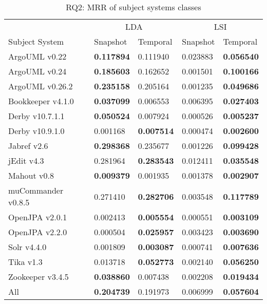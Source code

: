 \begin{table}[ht]
\renewcommand{\arraystretch}{1.3}
\centering
\caption{RQ2: MRR of subject systems classes}
\begin{tabular}{l|ll|ll}
    \toprule
                        & \multicolumn{2}{c|}{LDA}      &  \multicolumn{2}{c}{LSI}  \\
    Subject System      & Snapshot      & Temporal      & Snapshot      & Temporal  \\
    \midrule
ArgoUML v0.22 & {\bf 0.117894 } & 0.111940 & 0.023883 & {\bf 0.056540 } \\
ArgoUML v0.24 & {\bf 0.185603 } & 0.162652 & 0.001501 & {\bf 0.100166 } \\
ArgoUML v0.26.2 & {\bf 0.235158 } & 0.205164 & 0.001235 & {\bf 0.049686 } \\
Bookkeeper v4.1.0 & {\bf 0.037099 } & 0.006553 & 0.006395 & {\bf 0.027403 } \\
Derby v10.7.1.1 & {\bf 0.050524 } & 0.007924 & 0.000526 & {\bf 0.005237 } \\
Derby v10.9.1.0 & 0.001168 & {\bf 0.007514 } & 0.000474 & {\bf 0.002600 } \\
Jabref v2.6 & {\bf 0.298368 } & 0.235677 & 0.001226 & {\bf 0.099428 } \\
jEdit v4.3 & 0.281964 & {\bf 0.283543 } & 0.012411 & {\bf 0.035548 } \\
Mahout v0.8 & {\bf 0.009379 } & 0.001935 & 0.001378 & {\bf 0.002907 } \\
muCommander v0.8.5 & 0.271410 & {\bf 0.282706 } & 0.003548 & {\bf 0.117789 } \\
OpenJPA v2.0.1 & 0.002413 & {\bf 0.005554 } & 0.000551 & {\bf 0.003109 } \\
OpenJPA v2.2.0 & 0.000504 & {\bf 0.025957 } & 0.003423 & {\bf 0.003690 } \\
Solr v4.4.0 & 0.001809 & {\bf 0.003087 } & 0.000741 & {\bf 0.007636 } \\
Tika v1.3 & 0.013718 & {\bf 0.052773 } & 0.002140 & {\bf 0.056250 } \\
Zookeeper v3.4.5 & {\bf 0.038860 } & 0.007438 & 0.002208 & {\bf 0.019434 } \\
    \midrule
All & {\bf 0.204739 } & 0.191973 & 0.006999 & {\bf 0.057604 } \\
    \bottomrule
\end{tabular}
\label{table:rq2:classes}
\end{table}



